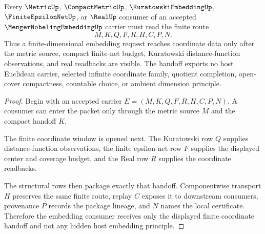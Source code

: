 \begin{theorem}
\label{thm:menger-nobeling-embedding-finite-coordinate-handoff}
Every $\MetricUp$, $\CompactMetricUp$, $\KuratowskiEmbeddingUp$, $\FiniteEpsilonNetUp$, or $\RealUp$ consumer of an accepted $\MengerNobelingEmbeddingUp$ carrier must read the finite route
$$
M,K,Q,F,R,H,C,P,N .
$$
Thus a finite-dimensional embedding request reaches coordinate data only after the metric source, compact finite-net budget, Kuratowski distance-function observations, and real readbacks are visible. The handoff exports no host Euclidean carrier, selected infinite coordinate family, quotient completion, open-cover compactness, countable choice, or ambient dimension principle.
\end{theorem}
\begin{proof}
Begin with an accepted carrier $E=(M,K,Q,F,R,H,C,P,N)$. A consumer can enter the packet only through the metric source $M$ and the compact handoff $K$.

The finite coordinate window is opened next. The Kuratowski row $Q$ supplies distance-function observations, the finite epsilon-net row $F$ supplies the displayed center and coverage budget, and the Real row $R$ supplies the coordinate readbacks.

The structural rows then package exactly that handoff. Componentwise transport $H$ preserves the same finite route, replay $C$ exposes it to downstream consumers, provenance $P$ records the package lineage, and $N$ names the local certificate. Therefore the embedding consumer receives only the displayed finite coordinate handoff and not any hidden host embedding principle.
\end{proof}


\begin{closurestatus}{\MengerNobelingEmbeddingUp}
  \theoryclosure{\seedClosure}
  \formalstatus{\unformalizedV}
\end{closurestatus}

